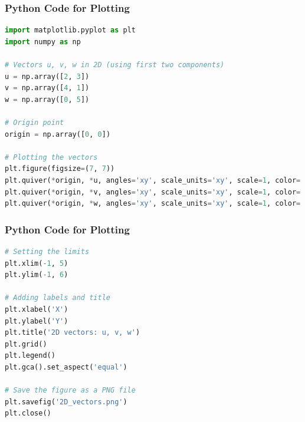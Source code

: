 \documentclass{beamer}
\theoremstyle{remark}
\numberwithin{equation}{section}
\begin{document}
\begin{frame}[fragile]
\frametitle{Python Code for Plotting}
\begin{lstlisting}[language=Python]
import matplotlib.pyplot as plt
import numpy as np

# Vectors u, v, w in 2D (using first two components)
u = np.array([2, 3])
v = np.array([4, 1])
w = np.array([0, 5])

# Origin point
origin = np.array([0, 0])

# Plotting the vectors
plt.figure(figsize=(7, 7))
plt.quiver(*origin, *u, angles='xy', scale_units='xy', scale=1, color='red', label='u = [2, 3]')
plt.quiver(*origin, *v, angles='xy', scale_units='xy', scale=1, color='green', label='v = [4, 1]')
plt.quiver(*origin, *w, angles='xy', scale_units='xy', scale=1, color='blue', label='w = [0, 5]')

\end{lstlisting}

\end{frame}
\begin{frame}[fragile]
\frametitle{Python Code for Plotting}
\begin{lstlisting}[language=Python]
# Setting the limits
plt.xlim(-1, 5)
plt.ylim(-1, 6)

# Adding labels and title
plt.xlabel('X')
plt.ylabel('Y')
plt.title('2D vectors: u, v, w')
plt.grid()
plt.legend()
plt.gca().set_aspect('equal')

# Save the figure as a PNG file
plt.savefig('2D_vectors.png')
plt.close()

\end{lstlisting}

\end{frame}
\end{document}

